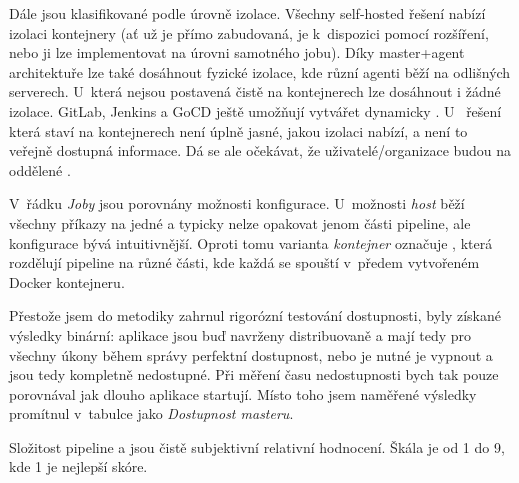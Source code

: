     Dále jsou \CI klasifikované podle úrovně izolace. Všechny self-hosted řešení nabízí izolaci kontejnery (ať už je přímo zabudovaná, je k~dispozici pomocí rozšíření, nebo ji lze implementovat na úrovni samotného jobu). Díky master+agent architektuře lze také dosáhnout fyzické izolace, kde různí agenti běží na odlišných serverech. U~\CI která nejsou postavená čistě na kontejnerech lze dosáhnout i žádné izolace. GitLab, Jenkins a GoCD ještě umožňují vytvářet dynamicky . U~ řešení která staví na kontejnerech není úplně jasné, jakou izolaci nabízí, a není to veřejně dostupná informace. Dá se ale očekávat, že uživatelé/organizace budou na oddělené .

    V~řádku \textit{Joby} jsou porovnány možnosti konfigurace. U~možnosti \textit{host} běží všechny příkazy na jedné  a typicky nelze opakovat jenom části pipeline, ale konfigurace bývá intuitivnější. Oproti tomu varianta \textit{kontejner} označuje \CI, která rozdělují pipeline na různé části, kde každá se spouští v~předem vytvořeném Docker kontejneru.

    Přestože jsem do metodiky zahrnul rigorózní testování dostupnosti, byly získané výsledky binární: aplikace jsou buď navrženy distribuovaně a mají tedy pro všechny úkony během správy perfektní dostupnost, nebo je nutné je vypnout a jsou tedy kompletně nedostupné. Při měření času nedostupnosti bych tak pouze porovnával jak dlouho aplikace startují. Místo toho jsem naměřené výsledky promítnul v~tabulce jako \textit{Dostupnost masteru}.

    Složitost pipeline a  jsou čistě subjektivní relativní hodnocení. Škála je od 1 do 9, kde 1 je nejlepší skóre.

